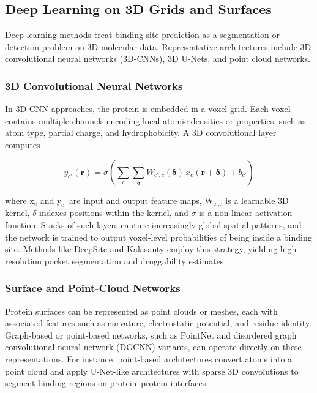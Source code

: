 \documentclass[12pt]{article}
\begin{document}
\subsection{Deep Learning on 3D Grids and Surfaces}
Deep learning methods treat binding site prediction as a segmentation or detection problem on 3D molecular data. Representative architectures include 3D convolutional neural networks (3D-CNNs), 3D U-Nets, and point cloud networks\cite{CH5_mou2025deep}.

\subsubsection{3D Convolutional Neural Networks}

In 3D-CNN approaches, the protein is embedded in a voxel grid. Each voxel contains multiple channels encoding local atomic densities or properties, such as atom type, partial charge, and hydrophobicity. A 3D convolutional layer computes

\begin{equation}
y_{c'}(\mathbf{r}) = \sigma \left( \sum_{c} \sum_{\boldsymbol{\delta}} W_{c',c}(\boldsymbol{\delta}) \, x_c(\mathbf{r} + \boldsymbol{\delta}) + b_{c'} \right)
\label{eq:3d_conv}
\end{equation}

where $\textrm{x}_\textrm{c}$ and $\textrm{y}_\textrm{c'}$ are input and output feature maps, $\textrm{W}_\textrm{c',c}$ is a learnable 3D kernel, $\delta$ indexes positions within the kernel, and $\sigma$ is a non-linear activation function. Stacks of such layers capture increasingly global spatial patterns, and the network is trained to output voxel-level probabilities of being inside a binding site\cite{CH5_mou2025deep}. Methods like DeepSite\cite{CH5_jimenez2017deepsite} and Kalasanty\cite{CH5_stepniewska2020improving} employ this strategy, yielding high-resolution pocket segmentation and druggability estimates.

\subsubsection{Surface and Point-Cloud Networks}

Protein surfaces can be represented as point clouds\cite{CH5_wang2022point} or meshes, each with associated features such as curvature, electrostatic potential, and residue identity. Graph-based or point-based networks, such as PointNet\cite{CH5_qi2017pointnet} and disordered graph convolutional neural network (DGCNN)\cite{CH5_wu2018dgcnn} variants, can operate directly on these representations. For instance, point-based architectures convert atoms into a point cloud and apply U-Net-like architectures\cite{CH5_liu2023refinepocket} with sparse 3D convolutions to segment binding regions on protein–protein interfaces.
\end{document}
